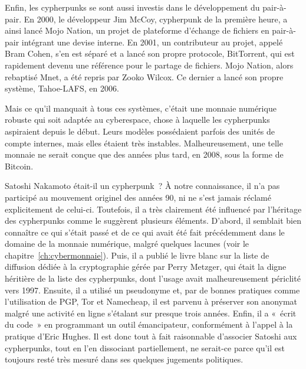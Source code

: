 Enfin, les cypherpunks se sont aussi investis dans le développement du pair-à-pair. En 2000, le développeur Jim McCoy, cypherpunk de la première heure, a ainsi lancé Mojo Nation, un projet de plateforme d'échange de fichiers en pair-à-pair intégrant une devise interne. En 2001, un contributeur au projet, appelé Bram Cohen, s'en est séparé et a lancé son propre protocole, BitTorrent, qui est rapidement devenu une référence pour le partage de fichiers. Mojo Nation, alors rebaptisé Mnet, a été repris par Zooko Wilcox. Ce dernier a lancé son propre système, Tahoe-LAFS, en 2006. %

Mais ce qu'il manquait à tous ces systèmes, c'était une monnaie numérique robuste qui soit adaptée au cyberespace, chose à laquelle les cypherpunks aspiraient depuis le début. Leurs modèles possédaient parfois des unités de compte internes, mais elles étaient très instables. Malheureusement, une telle monnaie ne serait conçue que des années plus tard, en 2008, sous la forme de Bitcoin.

Satoshi Nakamoto était-il un cypherpunk~? À notre connaissance, il n'a pas participé au mouvement originel des années 90, ni ne s'est jamais réclamé explicitement de celui-ci. Toutefois, il a très clairement été influencé par l'héritage des cypherpunks comme le suggèrent plusieurs éléments. D'abord, il semblait bien connaître ce qui s'était passé et de ce qui avait été fait précédemment dans le domaine de la monnaie numérique, malgré quelques lacunes (voir le chapitre~\ref{ch:cybermonnaie}). Puis, il a publié le livre blanc sur la liste de diffusion dédiée à la cryptographie gérée par Perry Metzger, qui était la digne héritière de la liste des cypherpunks, dont l'usage avait malheureusement périclité vers 1997. Ensuite, il a utilisé un pseudonyme et, par de bonnes pratiques comme l'utilisation de PGP, Tor et Namecheap, il est parvenu à préserver son anonymat malgré une activité en ligne s'étalant sur presque trois années. Enfin, il a «~écrit du code~» en programmant un outil émancipateur, conformément à l'appel à la pratique d'Eric Hughes. Il est donc tout à fait raisonnable d'associer Satoshi aux cypherpunks, tout en l'en dissociant partiellement, ne serait-ce parce qu'il est toujours resté très mesuré dans ses quelques jugements politiques.

